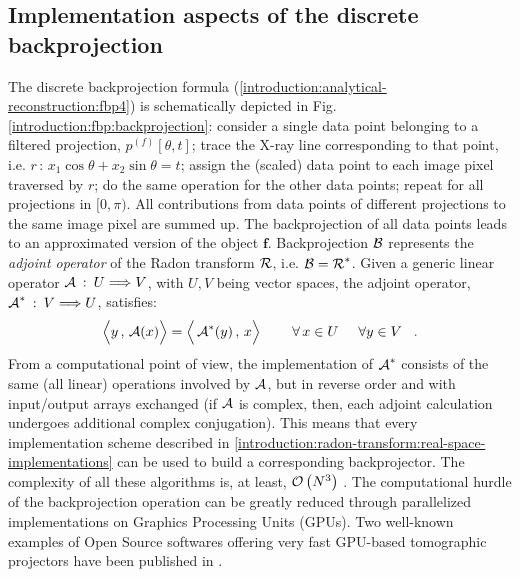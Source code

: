 {\subsection{Implementation aspects of the discrete backprojection}
\label{introduction:analytical-reconstruction:discrete-backprojection}
The discrete backprojection formula (\ref{introduction:analytical-reconstruction:fbp4}) is schematically depicted in
Fig. \ref{introduction:fbp:backprojection}: consider a single data point belonging to a filtered projection,
$p^{(f)}[\theta,t]$; trace the X-ray line corresponding to that point, i.e. $r\,:\,x_{1}\cos\theta + x_{2}\sin\theta = t$;
assign the (scaled) data point to each image pixel traversed by $r$; do the same operation for the other data points;
repeat for all projections in $[0,\pi)$. All contributions from data points of different projections to the same image pixel
are summed up. The backprojection of all data points leads to an approximated version of the object $\mathbf{f}$.
\newline
Backprojection $\operatorname{\mathcal{B}}$ represents the \emph{adjoint operator} of the Radon transform $\operatorname{\mathcal{R}}$,
i.e. $\operatorname{\mathcal{B}} = \operatorname{\mathcal{R}}^{*}$. 
Given a generic linear operator $\operatorname{\mathcal{A}}\::\: U \Longrightarrow V$, with $U, V$ being vector spaces,
the adjoint operator, $\operatorname{\mathcal{A}}^{*}\::\: V \Longrightarrow U$, satisfies:
\begin{equation}
	\Big\langle  y\,,\, \operatorname{\mathcal{A}}(x) \Big\rangle = \Big\langle  \operatorname{\mathcal{A}}^{*}(y)\,,\, x \Big\rangle \hspace{0.8cm} \forall\,x \in U 
	\hspace{0.5cm} \forall y \in V \hspace{0.3cm}.
\end{equation}
From a computational point of view, the implementation of $\operatorname{\mathcal{A}}^{*}$ consists
of the same (all linear) operations involved by $\operatorname{\mathcal{A}}$, but in reverse order and with input/output arrays
exchanged (if $\operatorname{\mathcal{A}}$ is complex, then, each adjoint calculation undergoes additional complex conjugation).
This means that every implementation scheme described in
\ref{introduction:radon-transform:real-space-implementations} can be used to build a corresponding backprojector. 
The complexity of all these algorithms is, at least, $\operatorname{\mathcal{O}}\left(N^{3}\right)$ 
\cite{Toft1996,Herman2009,Joseph1982,Deman2004,Lewitt1990,Horbelt2002}.
The computational hurdle of the backprojection operation can be greatly reduced through parallelized
implementations on Graphics Processing Units (GPUs). Two well-known examples of Open Source softwares
offering very fast GPU-based tomographic projectors have been published in \cite{Pedemonte2010,Palenstijn2011}.
}
